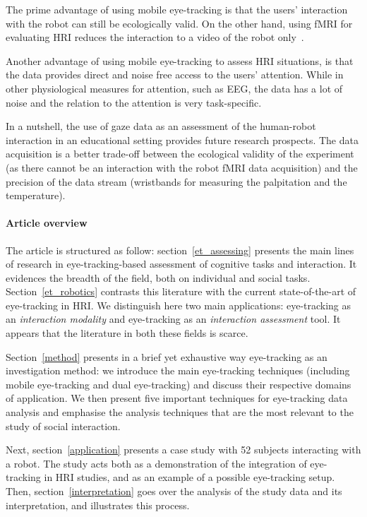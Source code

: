 \documentclass{sig-alternate}
\begin{document}
The prime advantage of using mobile eye-tracking is that the users' interaction
with the robot can still be ecologically valid. On the other hand, using fMRI
for evaluating HRI reduces the interaction to a video of the robot
only~\cite{rosenthal2013neural}.

Another advantage of using mobile eye-tracking to assess HRI situations, is that
the data provides direct and noise free access to the users' attention. While in
other physiological measures for attention, such as EEG, the data has a lot of
noise and the relation to the attention is very task-specific.

In a nutshell, the use of gaze data as an assessment of the human-robot
interaction in an educational setting provides future research prospects. The
data acquisition is a better trade-off between the ecological validity of the
experiment (as there cannot be an interaction with the robot fMRI data
acquisition) and the precision of the data stream (wristbands for measuring the
palpitation and the temperature).

\paragraph{Article overview}

The article is structured as follow: section~\ref{et_assessing} presents the
main lines of research in eye-tracking-based assessment of cognitive
tasks and interaction. It evidences the breadth of the field, both on individual
and social tasks. Section~\ref{et_robotics} contrasts this literature with the
current state-of-the-art of eye-tracking in HRI. We distinguish here two main
applications: eye-tracking as an \emph{interaction modality} and eye-tracking as
an \emph{interaction assessment} tool. It appears that the literature in both
these fields is scarce.

Section~\ref{method} presents in a brief yet exhaustive way eye-tracking as an
investigation method: we introduce the main eye-tracking techniques (including
mobile eye-tracking and dual eye-tracking) and discuss their respective domains
of application. We then present five important techniques for eye-tracking data
analysis and emphasise the analysis techniques that are the most relevant to the
study of social interaction.

Next, section~\ref{application} presents a case study with 52 subjects
interacting with a robot. The study acts both as a demonstration of the
integration of eye-tracking in HRI studies, and as an example of a possible
eye-tracking setup. Then, section~\ref{interpretation} goes over the analysis of
the study data and its interpretation, and illustrates this process.
\end{document}
